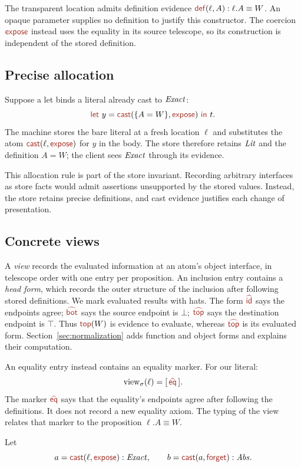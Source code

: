 The transparent location admits definition evidence
$\ev{def}(\ell,A):\ell.A\equiv W$.
An opaque parameter supplies no definition to justify this constructor.
The coercion $\ev{expose}$ instead uses the equality in its source
telescope, so its construction is independent of the stored definition.

\subsection*{Precise allocation}
Suppose a let binds a literal already cast to $\mathit{Exact}$:
\[
 \ev{let}\ y=\cast{\{A=W\}}{\ev{expose}}\ \ev{in}\ t.
\]
The machine stores the bare literal at a fresh location $\ell$ and
substitutes the atom $\cast{\ell}{\ev{expose}}$ for $y$ in the body.
The store therefore retains $\mathit{Lit}$ and the definition $A=W$;
the client sees $\mathit{Exact}$ through its evidence.

This allocation rule is part of the store invariant. Recording arbitrary
interfaces as store facts would admit assertions unsupported by the
stored values. Instead, the store retains precise definitions, and cast
evidence justifies each change of presentation.



\subsection*{Concrete views}
A \emph{view} records the evaluated information at an atom's object
interface, in telescope order with one entry per proposition.
An inclusion entry contains a \emph{head form}, which records the outer
structure of the inclusion after following stored definitions.
We mark evaluated results with hats. The form $\form{id}$ says the
endpoints agree; $\form{bot}$ says the source endpoint is $\bot$;
$\form{top}$ says the destination endpoint is $\top$.
Thus $\ev{top}(W)$ is evidence to evaluate, whereas $\form{top}$ is its
evaluated form. Section~\ref{sec:normalization} adds function and object
forms and explains their computation.

An equality entry instead contains an equality marker. For our literal:
\[
 \view{\ell}=[\,\form{eq}\,].
\]
The marker $\form{eq}$ says that the equality's endpoints agree after
following the definitions. It does not record a new equality axiom.
The typing of the view relates that marker to the proposition
$\ell.A\equiv W$.

Let
\[
 a=\cast{\ell}{\ev{expose}}:\ty{Exact},\qquad
 b=\cast{a}{\ev{forget}}:\ty{Abs}.
\]

